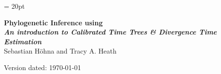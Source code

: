 \documentclass[11pt]{article}
\begin{document}
\renewcommand{\headrulewidth}{0.5pt}
\headsep = 20pt
\lhead{ }
\thispagestyle{plain}
\begin{center}

\textbf{\LARGE Phylogenetic Inference using \RevBayes}\\\vspace{2mm}
\textbf{\it{\Large An introduction to Calibrated Time Trees \& Divergence Time Estimation}}\\\vspace{2mm}
\vspace{1cm}
{\Large Sebastian H{\"o}hna and Tracy A. Heath}
\vspace{1cm}


\end{center}

\def \ResourcePath {./}
\def \GlobalResourcePath {../}


Version dated: \today
\end{document}
